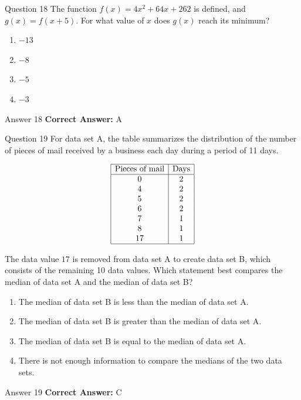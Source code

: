 \documentclass{beamer}
\begin{document}
\begin{frame}{Question 18}
\small
The function \(f(x) = 4x^2 + 64x + 262\) is defined, and \(g(x) = f(x + 5)\). For what value of \(x\) does \(g(x)\) reach its minimum?
\vspace{0.35cm}
\begin{enumerate}
    \item[A.] $-13$
    \item[B.] $-8$
    \item[C.] $-5$
    \item[D.] $-3$
\end{enumerate}
\end{frame}
\begin{frame}{Answer 18}
\small
\textbf{Correct Answer:} A
\end{frame}

\begin{frame}{Question 19}
\small
For data set A, the table summarizes the distribution of the number of pieces of mail received by a business each day during a period of 11 days.

\[
\begin{array}{|c|c|}
\hline
\text{Pieces of mail} & \text{Days} \\
\hline
0 & 2 \\
4 & 2 \\
5 & 2 \\
6 & 2 \\
7 & 1 \\
8 & 1 \\
17 & 1 \\
\hline
\end{array}
\]

The data value $17$ is removed from data set A to create data set B, which consists of the remaining 10 data values.  
Which statement best compares the median of data set A and the median of data set B?
\vspace{0.35cm}
\begin{enumerate}
    \item[A.] The median of data set B is less than the median of data set A.
    \item[B.] The median of data set B is greater than the median of data set A.
    \item[C.] The median of data set B is equal to the median of data set A.
    \item[D.] There is not enough information to compare the medians of the two data sets.
\end{enumerate}
\end{frame}
\begin{frame}{Answer 19}
\small
\textbf{Correct Answer:} C
\end{frame}
\end{document}
